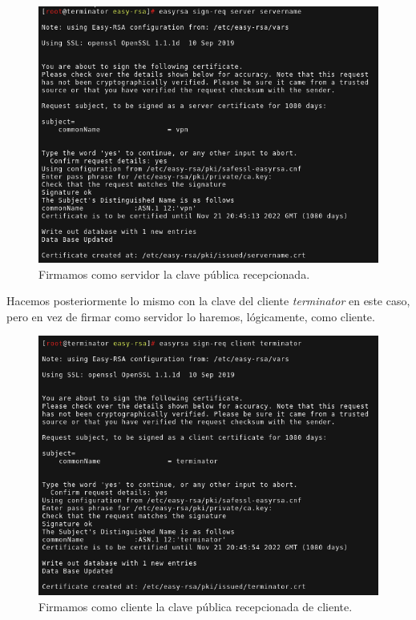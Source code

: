 \documentclass[a4paper, 11pt, titlepage]{article}
\begin{document}
            \begin{figure}[htp]
                \centering
                \includegraphics[width=1\textwidth]{resources/ca17.png}
                \caption{Firmamos como servidor la clave pública recepcionada.}
                \label{ca17}
            \end{figure}
        
            Hacemos posteriormente lo mismo con la clave del cliente \textit{terminator} en este caso, 
            pero en vez de firmar como servidor lo haremos, lógicamente, como cliente.
        
            \begin{figure}[htp]
                \centering
                \includegraphics[width=1\textwidth]{resources/ca18.png}
                \caption{Firmamos como cliente la clave pública recepcionada de cliente.}
                \label{ca18}
            \end{figure}
        
\end{document}
